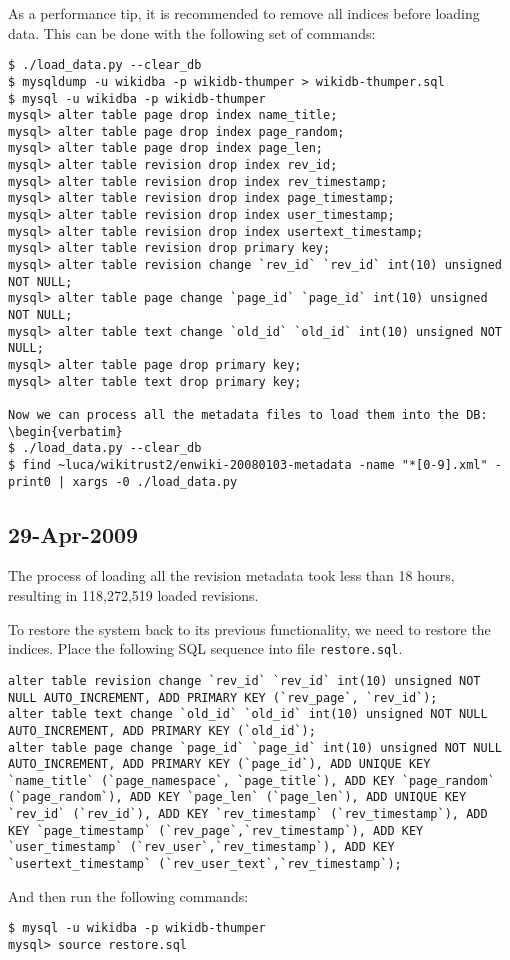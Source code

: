 As a performance tip, it is recommended to remove all indices
before loading data.  This can be done with the following set
of commands:
\begin{verbatim}
$ ./load_data.py --clear_db
$ mysqldump -u wikidba -p wikidb-thumper > wikidb-thumper.sql
$ mysql -u wikidba -p wikidb-thumper
mysql> alter table page drop index name_title;
mysql> alter table page drop index page_random;
mysql> alter table page drop index page_len;
mysql> alter table revision drop index rev_id;
mysql> alter table revision drop index rev_timestamp;
mysql> alter table revision drop index page_timestamp;
mysql> alter table revision drop index user_timestamp;
mysql> alter table revision drop index usertext_timestamp;
mysql> alter table revision drop primary key;
mysql> alter table revision change `rev_id` `rev_id` int(10) unsigned NOT NULL;
mysql> alter table page change `page_id` `page_id` int(10) unsigned NOT NULL;
mysql> alter table text change `old_id` `old_id` int(10) unsigned NOT NULL;
mysql> alter table page drop primary key;
mysql> alter table text drop primary key;

Now we can process all the metadata files to load them into the DB:
\begin{verbatim}
$ ./load_data.py --clear_db
$ find ~luca/wikitrust2/enwiki-20080103-metadata -name "*[0-9].xml" -print0 | xargs -0 ./load_data.py 
\end{verbatim}

\subsection{29-Apr-2009}

The process of loading all the revision metadata took less than 18 hours,
resulting in 118,272,519 loaded revisions.

To restore the system back to its previous functionality, we need to
restore the indices.  Place the following SQL sequence into
file \texttt{restore.sql}.
%
\begin{verbatim}
alter table revision change `rev_id` `rev_id` int(10) unsigned NOT NULL AUTO_INCREMENT, ADD PRIMARY KEY (`rev_page`, `rev_id`);
alter table text change `old_id` `old_id` int(10) unsigned NOT NULL AUTO_INCREMENT, ADD PRIMARY KEY (`old_id`);
alter table page change `page_id` `page_id` int(10) unsigned NOT NULL AUTO_INCREMENT, ADD PRIMARY KEY (`page_id`), ADD UNIQUE KEY `name_title` (`page_namespace`, `page_title`), ADD KEY `page_random` (`page_random`), ADD KEY `page_len` (`page_len`), ADD UNIQUE KEY `rev_id` (`rev_id`), ADD KEY `rev_timestamp` (`rev_timestamp`), ADD KEY `page_timestamp` (`rev_page`,`rev_timestamp`), ADD KEY `user_timestamp` (`rev_user`,`rev_timestamp`), ADD KEY `usertext_timestamp` (`rev_user_text`,`rev_timestamp`);
\end{verbatim}
%
And then run the following commands:
\begin{verbatim}
$ mysql -u wikidba -p wikidb-thumper
mysql> source restore.sql
\end{verbatim}

